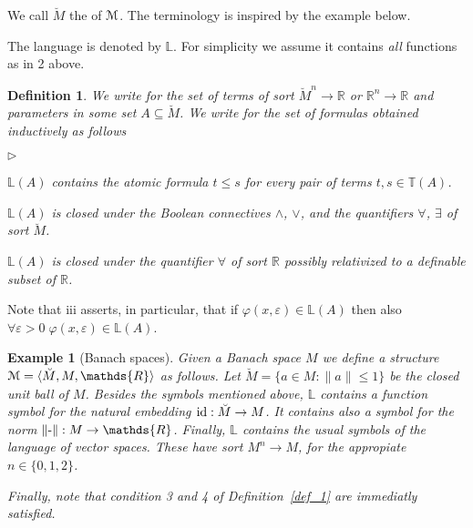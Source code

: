 \documentclass[12pt,letterpaper,oneside,reqno]{amsart}
\newcommand{\mylabel}[1]{{#1}\hfill}
\renewenvironment{itemize}
  {\begin{list}{$\triangleright$}{%
   \setlength{\parskip}{0mm}
   \setlength{\topsep}{.2\baselineskip}
   \setlength{\rightmargin}{0mm}
   \setlength{\listparindent}{0mm}
   \setlength{\itemindent}{0mm}
   \setlength{\labelwidth}{3ex}
   \setlength{\itemsep}{.2\baselineskip}
   \setlength{\parsep}{.2\baselineskip}
   \setlength{\partopsep}{0mm}
   \setlength{\labelsep}{1ex}
   \setlength{\leftmargin}{\labelwidth+\labelsep}
   \let\makelabel\mylabel}}{%
   \end{list}}
\theoremstyle{plain}
\newtheorem{definition}[theorem]{Definition}
\newtheorem{example}[theorem]{Example}
\theoremstyle{remark}
\renewcommand*{\emph}[1]{%
   \smash{\tikz[baseline]\node[rectangle, fill=olive!25, rounded corners, inner xsep=0.5ex, inner ysep=0.2ex, anchor=base, minimum height = 2.7ex]{#1};}}
\begin{document}
We call $\breve M$ the \emph{unit ball\/} of ${\EuScript M}$.
The terminology is inspired by the example below.

The language is denoted by $\mathds{L}$.
For simplicity we assume it contains \textit{all\/} functions as in 2 above.

\begin{definition}
  We write \emph{$\mathds{T}(A)$\/} for the set of terms of sort $\breve M^n\to\mathds{R}$ or $\mathds{R}^n\to\mathds{R}$ and parameters in some set $A\subseteq \breve M$.
  We write \emph{$\mathds{L}(A)$\/} for the set of formulas obtained inductively as follows
  \begin{itemize}
  \item[i.] $\mathds{L}(A)$ contains the atomic formula $t\le s$ for every pair of terms $t,s\in\mathds{T}(A)$.
  \item[ii.] $\mathds{L}(A)$ is closed under the Boolean connectives $\wedge$, $\vee$, and the quantifiers $\forall$, $\exists$ of sort $\breve M$.
  \item[iii.] $\mathds{L}(A)$ is closed under the quantifier $\forall$ of sort $\mathds{R}$ possibly relativized to a definable subset of $\mathds{R}$.
  \end{itemize}
\end{definition}

Note that iii asserts, in particular, that if $\varphi(x,\varepsilon)\in\mathds{L}(A)$ then also $\forall\varepsilon{>}0\;\varphi(x,\varepsilon)\in\mathds{L}(A)$.

\begin{example}[Banach spaces]
  Given a Banach space  $M$ we define a structure ${\EuScript M}=\langle \breve M,M,\mathds{R}\rangle$ as follows.
  Let $\breve M=\{a\in M: \|a\|\le1\}$ be the closed unit ball of $M$.
  Besides the symbols mentioned above, $\mathds{L}$ contains a function symbol for the natural embedding ${\rm id}:\breve M\to M$.
  It contains also a symbol for the norm $\|\mbox-\|:M\to\mathds{R}$.
  Finally, $\mathds{L}$ contains the usual symbols of the language of vector spaces.
  These have sort ${M}^n\to M$, for the appropiate $n\in\{0,1,2\}$.

  Finally, note that condition 3 and 4 of Definition~\ref{def_1} are immediatly satisfied.
\end{example}


\end{document}
